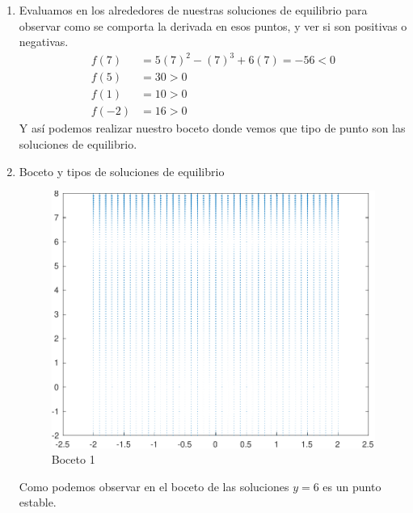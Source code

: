 \begin{itemize}
\begin{enumerate}
        \item  Evaluamos en los alrededores de nuestras soluciones de equilibrio para observar como se comporta la derivada en esos puntos, y ver si son positivas o negativas.
        \begin{align*}
            f(7) &= 5(7)^2 -(7)^3+6(7) =-56 < 0\\
            f(5) &= 30 > 0\\
            f(1) &= 10 > 0 \\
            f(-2) &= 16 > 0
        \end{align*}
        Y así podemos realizar nuestro boceto donde vemos que tipo de punto son las soluciones de equilibrio.
        \item Boceto y tipos de soluciones de equilibrio
\begin{figure}[H]
    \centering
    \includegraphics[scale=.8]{IM/B2.pdf}
    \caption{Boceto 1}
    \label{fig=int1}
\end{figure}
        
        Como podemos observar en el boceto de las soluciones $y=6 $ es un punto estable.
\end{enumerate}


\end{itemize}
